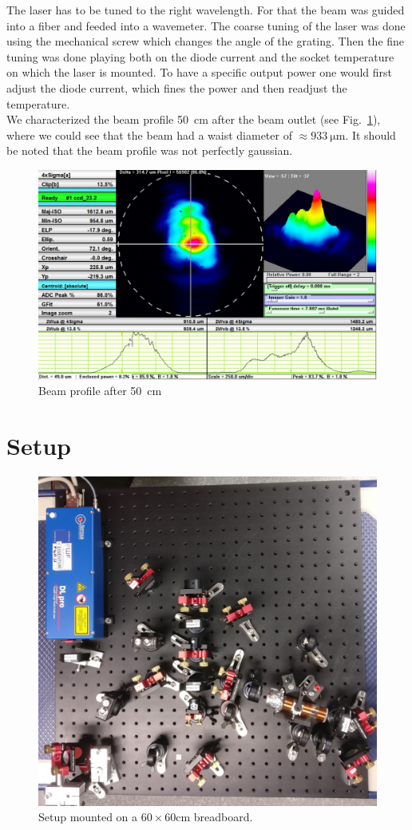 The laser has to be tuned to the right wavelength.
For that the beam was guided into a fiber and feeded into a wavemeter. The coarse 
tuning of the laser was done using the mechanical screw which changes the angle 
of the grating. Then the fine tuning was done playing both on the diode current
and the socket temperature on which the laser is mounted. To have a specific 
output power one would first adjust the diode current, which fines the power
and then readjust the temperature. \\
We characterized the beam profile \SI{50}{\centi\meter} after the beam outlet
(see Fig.~\ref{fig:beam50cm}), where we could see that the beam had a waist 
diameter of \(\approx\SI{933}{\micro\meter}\). It should be noted that the beam 
profile was not perfectly gaussian.

\begin{figure}
    \centering
    \includegraphics[width=.7\textwidth]{beam50cm}
    \caption{\label{fig:beam50cm} Beam profile after \SI{50}{\centi\meter}}
\end{figure}

\section{Setup} %

\begin{figure}[H]
    \centering
    \includegraphics[width=.5\textwidth]{breadboard}
    \caption{\label{fig:breadboard} Setup mounted on a \(60 \times 60 \)\si{\centi\meter} 
    breadboard.}
\end{figure}


